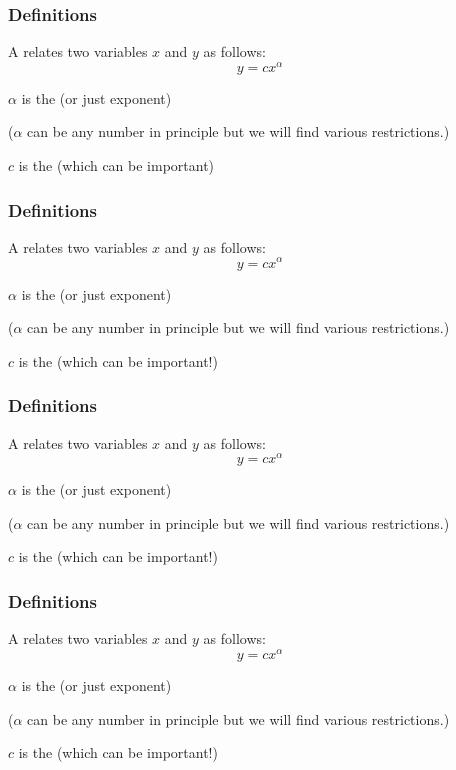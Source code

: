 \begin{frame}
  \frametitle{Definitions}

A  relates two
variables $x$ and $y$ as follows:
{\Large
$$ y = c x^\alpha $$
}

\inv

$\alpha$ is the  (or just exponent)

($\alpha$ can be any number in principle but we will
find various restrictions.)

$c$ is the  (which can be important)

\end{frame}

\begin{frame}
  \frametitle{Definitions}

A  relates two
variables $x$ and $y$ as follows:
{\Large
$$ y = c x^\alpha $$
}

$\alpha$ is the  (or just exponent)

\inv 

($\alpha$ can be any number in principle but we will
find various restrictions.)

$c$ is the  (which can be important!)

\end{frame}

\begin{frame}
  \frametitle{Definitions}

A  relates two
variables $x$ and $y$ as follows:
{\Large
$$ y = c x^\alpha $$
}

$\alpha$ is the  (or just exponent)

($\alpha$ can be any number in principle but we will
find various restrictions.)

\inv

$c$ is the  (which can be important!)

\end{frame}

\begin{frame}
  \frametitle{Definitions}

A  relates two
variables $x$ and $y$ as follows:
{\Large
$$ y = c x^\alpha $$
}

$\alpha$ is the  (or just exponent)

($\alpha$ can be any number in principle but we will
find various restrictions.)

$c$ is the  (which can be important!)

\end{frame}

